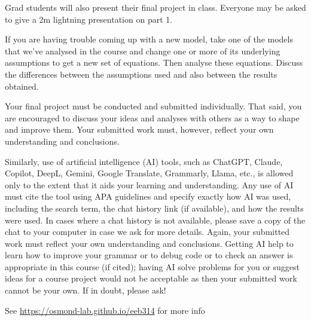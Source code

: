 \documentclass[
]{article}
\begin{document}
\begin{tcolorbox}[breakable,colback=cyan!8,colframe=cyan!65!black,title=Class presentations,fonttitle=\bfseries]
Grad students will also present their final project in class. Everyone
may be asked to give a 2m lightning presentation on part 1.\end{tcolorbox}

\begin{tcolorbox}[breakable,colback=green!8,colframe=green!65!black,title=Tip,fonttitle=\bfseries]
If you are having trouble coming up with a new model, take one of the
models that we've analysed in the course and change one or more of its
underlying assumptions to get a new set of equations. Then analyse these
equations. Discuss the differences between the assumptions used and also
between the results obtained.\end{tcolorbox}

\begin{tcolorbox}[breakable,colback=red!8,colframe=red!65!black,title=AI policy,fonttitle=\bfseries]
Your final project must be conducted and submitted individually. That
said, you are encouraged to discuss your ideas and analyses with others
as a way to shape and improve them. Your submitted work must, however,
reflect your own understanding and conclusions.

Similarly, use of artificial intelligence (AI) tools, such as ChatGPT,
Claude, Copilot, DeepL, Gemini, Google Translate, Grammarly, Llama,
etc., is allowed only to the extent that it aids your learning and
understanding. Any use of AI must cite the tool using APA guidelines and
specify exactly how AI was used, including the search term, the chat
history link (if available), and how the results were used. In cases
where a chat history is not available, please save a copy of the chat to
your computer in case we ask for more details. Again, your submitted
work must reflect your own understanding and conclusions. Getting AI
help to learn how to improve your grammar or to debug code or to check
an answer is appropriate in this course (if cited); having AI solve
problems for you or suggest ideas for a course project would not be
acceptable as then your submitted work cannot be your own. If in doubt,
please ask!\end{tcolorbox}

\clearpage
\vspace*{\fill}
\begin{center}
\Large See \url{https://osmond-lab.github.io/eeb314} for more info
\end{center}
\vspace*{\fill}
\end{document}
